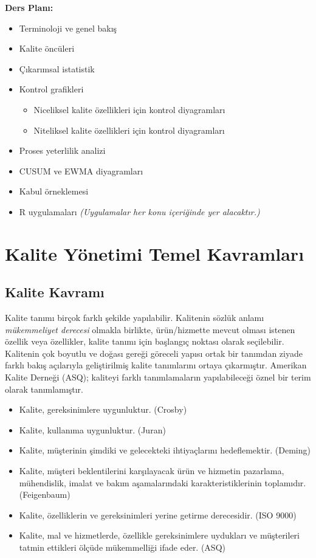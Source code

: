 \documentclass[
]{book}
\providecommand{\tightlist}{%
  \setlength{\itemsep}{0pt}\setlength{\parskip}{0pt}}
\begin{document}
\textbf{Ders Planı:}

\begin{itemize}
\item
  Terminoloji ve genel bakış
\item
  Kalite öncüleri
\item
  Çıkarımsal istatistik
\item
  Kontrol grafikleri

  \begin{itemize}
  \tightlist
  \item
    Niceliksel kalite özellikleri için kontrol diyagramları
  \item
    Niteliksel kalite özellikleri için kontrol diyagramları
  \end{itemize}
\item
  Proses yeterlilik analizi
\item
  CUSUM ve EWMA diyagramları
\item
  Kabul örneklemesi
\item
  R uygulamaları \emph{(Uygulamalar her konu içeriğinde yer alacaktır.)}
\end{itemize}

\hypertarget{kalite-yuxf6netimi-temel-kavramlarux131}{%
\chapter{Kalite Yönetimi Temel Kavramları}\label{kalite-yuxf6netimi-temel-kavramlarux131}}

\hypertarget{kalite-kavramux131}{%
\section{Kalite Kavramı}\label{kalite-kavramux131}}

Kalite tanımı birçok farklı şekilde yapılabilir. Kalitenin sözlük anlamı \emph{mükemmeliyet derecesi} olmakla birlikte, ürün/hizmette mevcut olması istenen özellik veya özellikler, kalite tanımı için başlangıç noktası olarak seçilebilir. Kalitenin çok boyutlu ve doğası gereği göreceli yapısı ortak bir tanımdan ziyade farklı bakış açılarıyla geliştirilmiş kalite tanımlarını ortaya çıkarmıştır. Amerikan Kalite Derneği (ASQ); kaliteyi farklı tanımlamaların yapılabileceği öznel bir terim olarak tanımlamıştır.

\begin{itemize}
\tightlist
\item
  Kalite, gereksinimlere uygunluktur. (Crosby)
\item
  Kalite, kullanıma uygunluktur. (Juran)
\item
  Kalite, müşterinin şimdiki ve gelecekteki ihtiyaçlarını hedeflemektir. (Deming)
\item
  Kalite, müşteri beklentilerini karşılayacak ürün ve hizmetin pazarlama, mühendislik, imalat ve bakım aşamalarındaki karakteristiklerinin toplamıdır. (Feigenbaum)
\item
  Kalite, özelliklerin ve gereksinimleri yerine getirme derecesidir. (ISO 9000)
\item
  Kalite, mal ve hizmetlerde, özellikle gereksinimlere uydukları ve müşterileri tatmin ettikleri ölçüde mükemmelliği ifade eder. (ASQ)
\end{itemize}
\end{document}
